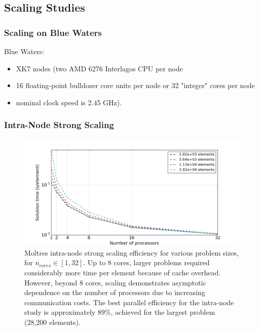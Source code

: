 \subsection{Scaling Studies}
\begin{frame}
        \frametitle{Scaling on Blue Waters}
Blue Waters:
         \begin{itemize}
                 \item XK7 nodes (two AMD 6276 Interlagos CPU per node
                 \item 16 floating-point bulldozer core units per node or 32 "integer" cores per node 
                 \item nominal clock speed is 2.45 GHz).
         \end{itemize}
\end{frame}

\begin{frame}
        \frametitle{Intra-Node Strong Scaling}
        \vspace*{-0.2in}
\begin{figure}[htpb]
  \centering
  \includegraphics[width=\textwidth]{./images/intra-node_strong.png}
  \caption{Moltres intra-node strong scaling efficiency for various problem
        sizes, for $n_{cores} \in [1,32]$.  Up to 8 cores, larger problems required considerably more time per element because of cache overhead. However, beyond 8 cores, scaling demonstrates asymptotic dependence on the number of processors due to increasing communication costs. The best parallel efficiency for the intra-node study is approximately 89\%, achieved for the largest problem (28,200 elements).}
  \label{fig:intra_strong_scaling}
\end{figure}

\end{frame}

